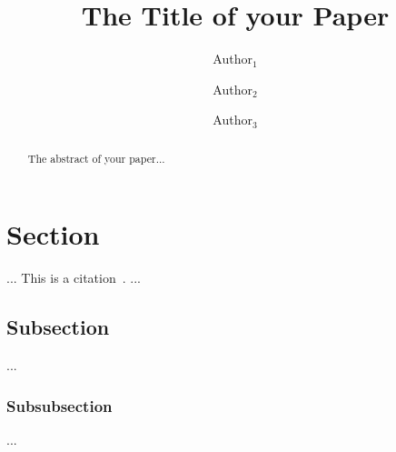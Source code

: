 \documentclass[10pt]{article}
\begin{document}
\title{The Title of your Paper}

\author{Author$_1$}

\author{Author$_2$}
\author{Author$_3$}

\date{}

\maketitle

\begin{abstract}
The abstract of your paper...
\end{abstract}

\section{Section}

... This is a citation~\cite{citedpaper}. ...

\subsection*{Subsection}

...

\subsubsection*{Subsubsection}

...



\end{document}
